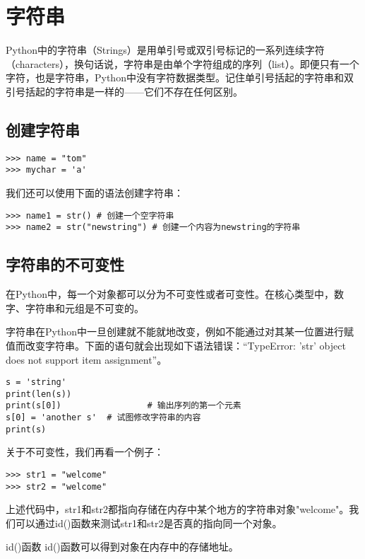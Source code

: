 \section{字符串}

Python中的字符串（Strings）是用单引号或双引号标记的一系列连续字符（characters），换句话说，字符串是由单个字符组成的序列（list）。即便只有一个字符，也是字符串，Python中没有字符数据类型。记住单引号括起的字符串和双引号括起的字符串是一样的——它们不存在任何区别。

\subsection{创建字符串}

\begin{lstlisting}
>>> name = "tom"
>>> mychar = 'a'
\end{lstlisting}

我们还可以使用下面的语法创建字符串：

\begin{lstlisting}
>>> name1 = str() # 创建一个空字符串
>>> name2 = str("newstring") # 创建一个内容为newstring的字符串
\end{lstlisting}

\subsection{字符串的不可变性}

在Python中，每一个对象都可以分为不可变性或者可变性。在核心类型中，数字、字符串和元组是不可变的。

字符串在Python中一旦创建就不能就地改变，例如不能通过对其某一位置进行赋值而改变字符串。下面的语句就会出现如下语法错误：“TypeError: 'str' object does not support item assignment”。

\begin{lstlisting}
s = 'string'
print(len(s))
print(s[0])  				# 输出序列的第一个元素
s[0] = 'another s' 	# 试图修改字符串的内容
print(s)
\end{lstlisting}

关于不可变性，我们再看一个例子：

\begin{lstlisting}
>>> str1 = "welcome"
>>> str2 = "welcome"
\end{lstlisting}

上述代码中，str1和str2都指向存储在内存中某个地方的字符串对象"welcome"。我们可以通过id()函数来测试str1和str2是否真的指向同一个对象。

\begin{myremark}{id()函数}
id()函数可以得到对象在内存中的存储地址。
\end{myremark}

